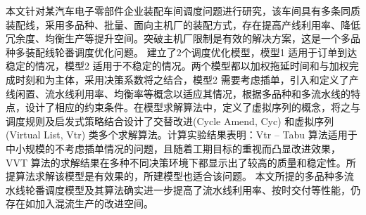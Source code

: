 本文针对某汽车电子零部件企业装配车间调度问题进行研究，该车间具有多条同质装配线，采用多品种、批量、面向主机厂的装配方式，存在提高产线利用率、降低冗余度、均衡生产等提升空间。突破主机厂限制是有效的解决方案，这是一个多品种多装配线轮番调度优化问题。
建立了$2$个调度优化模型，模型1 适用于订单到达稳定的情况，模型2 适用于不稳定的情况。两个模型都以加权拖延时间和与加权完成时刻和为主体，采用决策系数将之结合，模型2 需要考虑插单，引入和定义了产线闲置、流水线利用率、均衡率等概念以适应其情况，根据多品种和多流水线的特点，设计了相应的约束条件。在模型求解算法中，定义了虚拟序列的概念，将之与调度规则及启发式策略结合设计了交替改进(Cycle Amend, Cyc) 和虚拟序列(Virtual List, Vtr) 类多个求解算法。计算实验结果表明：Vtr -- Tabu 算法适用于中小规模的不考虑插单情况的问题，且随着工期目标的重视而凸显改进效果，VVT 算法的求解结果在多种不同决策环境下都显示出了较高的质量和稳定性。所提算法求解该模型是有效果的，所建模型也适合该问题。
本文所提的多品种多流水线轮番调度模型及其算法确实进一步提高了流水线利用率、按时交付等性能，仍存在如加入混流生产的改进空间。

